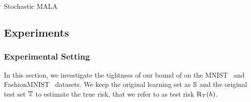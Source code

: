 \begin{algorithm}[t]
  \caption{Stochastic MALA}
  \begin{algorithmic}[1]

    
    
    
        \EndIf
    \EndFor
\State{\Return{$\wbf$}}
\end{algorithmic}
\label{chap:dis-mu:algo:sto-mala}
\end{algorithm}

\subsection{Experiments}

\subsubsection{Experimental Setting}
\label{chap:dis-mu:sec:expes-setting}

In this section, we investigate the tightness of our bound of   on the MNIST~\citep{LeCunCortesBurges1998} and FashionMNIST~\citep{XiaoRasulVollgraf2017} datasets. 
We keep the original learning set as $\S$ and the original test set $\T$ to estimate the true risk, that we refer to as test risk $\Risk_{\dT}(\h)$.\\

